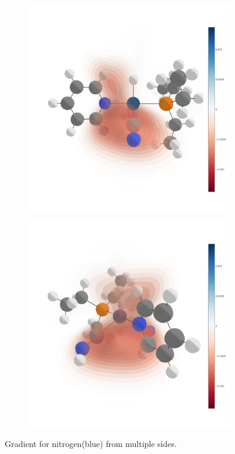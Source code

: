 \begin{figure}
  \medskip

  \begin{subfigure}[t]{.5\textwidth}
    \centering
    \includegraphics[width=\linewidth]{figures/evaluation/elem2-N-SIDE.png}
  \end{subfigure}
  \hfill
  \begin{subfigure}[t]{.5\textwidth}
    \centering
    \includegraphics[width=\linewidth]{figures/evaluation/elem2-N-BACK.png}
  \end{subfigure}
  \caption[Gradient in 3D space from multiple angles]{Gradient for nitrogen(blue) from multiple sides.}
  \label{fig:gradient-sides}
\end{figure}
